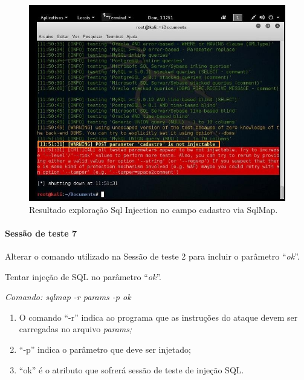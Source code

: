 \documentclass[
    12pt,               %
    openright,          %
    oneside,            %
    a4paper,            %
    section=TITLE,     %
    english,            %
    french,             %
    spanish,            %
    brazil              %
    ]{abntex2}
\begin{document}
\begin{figure}[htp]
\centering
\caption{Resultado exploração Sql Injection no campo cadastro via SqlMap.}
\includegraphics[width=450px]{image21.jpeg}
\end{figure}
\ifdefined\FloatBarrier \FloatBarrier \fi



\paragraph*{Sessão de teste 7}

Alterar o comando utilizado na Sessão de teste 2 para incluir o parâmetro \textquotedblleft{}\emph{ok}\textquotedblright{}.


Tentar injeção de SQL no parâmetro \textquotedblleft{}\emph{ok}\textquotedblright{}.


\emph{Comando: sqlmap -r params -p ok}



\begin{enumerate}[start=1]
	
\item O comando \textquotedblleft{}-r\textquotedblright{} indica ao programa que as instruções do ataque devem ser carregadas no arquivo \emph{params;}
	
\item \textquotedblleft{}-p\textquotedblright{} indica o parâmetro que deve ser injetado;
	
\item \textquotedblleft{}ok\textquotedblright{} é o atributo que sofrerá sessão de teste de injeção SQL.

\end{enumerate}
\end{document}
